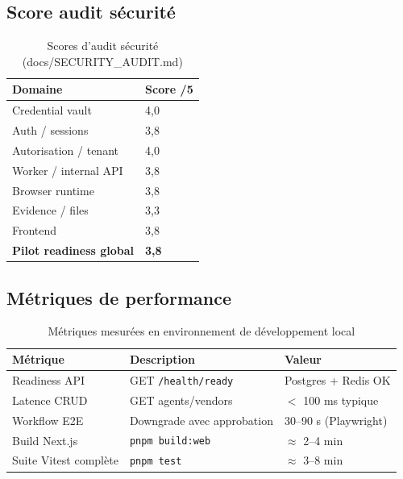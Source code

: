 \subsection{Score audit sécurité}

\begin{table}[H]
\centering
\caption{Scores d'audit sécurité (docs/SECURITY\_AUDIT.md)}
\label{tab:security_audit}
\begin{tabularx}{\textwidth}{@{}p{4.5cm}C{2.2cm}@{}}
\toprule
\textbf{Domaine} & \textbf{Score /5} \\
\midrule
{}
Credential vault & 4,0 \\
Auth / sessions & 3,8 \\
Autorisation / tenant & 4,0 \\
Worker / internal API & 3,8 \\
Browser runtime & 3,8 \\
Evidence / files & 3,3 \\
Frontend & 3,8 \\
\textbf{Pilot readiness global} & \textbf{3,8} \\
\bottomrule
\end{tabularx}
\end{table}

\subsection{Métriques de performance}

\begin{table}[H]
\centering
\caption{Métriques mesurées en environnement de développement local}
\label{tab:perfs}
\begin{tabularx}{\textwidth}{@{}p{5cm}Xp{2.6cm}@{}}
\toprule
\textbf{Métrique} & \textbf{Description} & \textbf{Valeur} \\
\midrule
\rowcolor{rowgray}
Readiness API & GET \texttt{/health/ready} & Postgres + Redis OK \\
Latence CRUD & GET agents/vendors & $<$ 100 ms typique \\
\rowcolor{rowgray}
Workflow E2E & Downgrade avec approbation & 30--90 s (Playwright) \\
Build Next.js & \texttt{pnpm build:web} & $\approx$ 2--4 min \\
\rowcolor{rowgray}
Suite Vitest complète & \texttt{pnpm test} & $\approx$ 3--8 min \\
\bottomrule
\end{tabularx}
\end{table}

